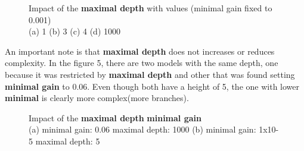 \begin{answer}
\begin{figure}
        \caption{Impact of the \textbf{maximal depth} with values (minimal gain fixed to 0.001)
            \\
            (a) 1 (b) 3 (c) 4 (d) 1000}
    \end{figure}
    An important note is that \textbf{maximal depth} does not increases or reduces complexity. In the figure 5, there
    are two models with the same depth, one because it was restricted by \textbf{maximal depth} and other that was found
    setting \textbf{minimal gain} to 0.06. Even though both have a height of 5, the one with lower \textbf{minimal} is
    clearly more complex(more branches).
    \\
    \begin{figure}
        \centering
        \caption{Impact of the \textbf{maximal depth} \textbf{minimal gain}
            \\
            (a) minimal gain: 0.06 maximal depth: 1000 (b) minimal gain: 1x10-5 maximal depth: 5}
    \end{figure}
\end{answer}
\pagebreak